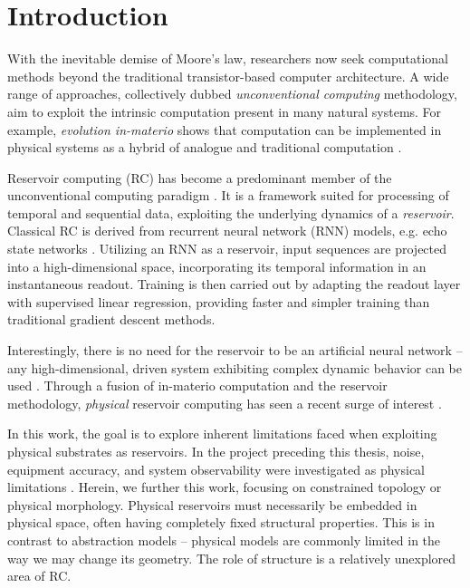 \chapter{Introduction}
\label{ch:intro}

With the inevitable demise of Moore's law, researchers now seek computational
methods beyond the traditional transistor-based computer architecture. A wide
range of approaches, collectively dubbed \textit{unconventional computing}
methodology, aim to exploit the intrinsic computation present in many natural
systems. For example, \textit{evolution in-materio} shows that computation can
be implemented in physical systems as a hybrid of analogue and traditional
computation \cite{miller_evolution--materio_2014}.

Reservoir computing (RC) has become a predominant member of the unconventional
computing paradigm \cite{adamatzky_reservoir_2017}. It is a framework suited for
processing of temporal and sequential data, exploiting the underlying dynamics
of a \textit{reservoir}. Classical RC is derived from recurrent neural network
(RNN) models, e.g. echo state networks \cite{jaeger_echo_2001}. Utilizing an RNN
as a reservoir, input sequences are projected into a high-dimensional space,
incorporating its temporal information in an instantaneous readout. Training is
then carried out by adapting the readout layer with supervised linear
regression, providing faster and simpler training than traditional gradient
descent methods.

Interestingly, there is no need for the reservoir to be an artificial neural
network -- any high-dimensional, driven system exhibiting complex dynamic
behavior can be used \cite{schrauwen_overview_2007}. Through a fusion of
in-materio computation and the reservoir methodology, \textit{physical}
reservoir computing has seen a recent surge of interest
\cite{adamatzky_reservoir_2017, tanaka_recent_2018}.

In this work, the goal is to explore inherent limitations faced when exploiting
physical substrates as reservoirs. In the project preceding this thesis, noise,
equipment accuracy, and system observability were investigated as physical
limitations \cite{aven_exploring_2019}. Herein, we further this work, focusing
on constrained topology or physical morphology. Physical reservoirs must
necessarily be embedded in physical space, often having completely fixed
structural properties. This is in contrast to abstraction models -- physical
models are commonly limited in the way we may change its geometry. The role of
structure is a relatively unexplored area of RC.

